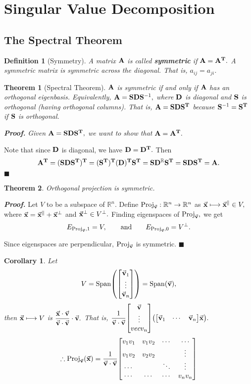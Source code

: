 \documentclass[12pt, a4paper]{article}
\newtheorem{thm}{Theorem}[subsection]
\newtheorem{df}{Definition}[subsection]
\newtheorem{cor}{Corollary}[section]
\newenvironment*{prf}{\par\indent\textbf{\textit{Proof. }}}{\hfill $\blacksquare$\par}
\def\R{{\mathbb{R}}}
\def\T{{\vb{T}}}
\def\Span{\mathrm{Span}}
\def\Proj{\mathrm{Proj}}
\def\vecx{\va{x}}
\def\vecv{\va{v}}
\def\matrixA{\vb{A}}
\def\matrixD{\vb{D}}
\def\matrixS{\vb{S}}
\begin{document}
\newpage
\section{Singular Value Decomposition}
\subsection{The Spectral Theorem}
\begin{df}[Symmetry]
	A matrix $\matrixA$ is called \textbf{symmetric} if $\matrixA=\matrixA^\T.$ A symmetric matrix is symmetric across the diagonal. That is, $a_{ij}=a_{ji}.$	
\end{df}
\begin{thm}[Spectral Theorem]
	$\matrixA$ is symmetric if and only if $\matrixA$ has an orthogonal eigenbasis. Equivalently, $\matrixA=\matrixS\matrixD\matrixS^{-1},$ where $\matrixD$ is diagonal and $\matrixS$ is orthogonal (having orthogonal columns). That is, $\matrixA=\matrixS\matrixD\matrixS^\T$ because $\matrixS^{-1}=\matrixS^\T$ if $\matrixS$ is orthogonal. 	
\end{thm}
\begin{prf}
	\textit{Given $\matrixA=\matrixS\matrixD\matrixS^\T,$ we want to show that $\matrixA=\matrixA^\T.$}\par Note that since $\matrixD$ is diagonal, we have $\matrixD=\matrixD^\T.$ Then
	\[\matrixA^\T=(\matrixS\matrixD\matrixS^\T)^\T=(\matrixS^\T)^\T(\matrixD)^\T\matrixS^\T=\matrixS\matrixD^\R\matrixS^\T=\matrixS\matrixD\matrixS^\T=\matrixA.\]
\end{prf}
\begin{thm}
	Orthogonal projection is symmetric. 	
\end{thm}
\begin{prf}
	Let $V$ to be a subspace of $\R^n$. Define $\Proj_{\vecv}:\R^n\to\R^n$ as $\vecx\longmapsto\vecx^\parallel\in V,$ where $\vecx=\vecx^\parallel+\vecx^\perp$ and $\vecx^\perp\in V^\perp.$ Finding eigenspaces of $\Proj_{\vecv},$ we get \[E_{\Proj_{\vecv},1}=V,\qquad\text{and}\qquad E_{\Proj_{\vecv},0}=V^\perp.\]\par Since eigenspaces are perpendicular, $\Proj_{\vecv}$ is symmetric. 
\end{prf}
\begin{cor}
	Let \[V=\Span\qty(\mqty[\vecv_1\\\vdots\\\vecv_n])=\Span(\vecv),\] then $\vecx\longmapsto V$ is $\dfrac{\vecx\cdot\vecv}{\vecv\cdot\vecv}\cdot\vecv.$ That is, $\dfrac{1}{\vecv\cdot\vecv}\mqty[\vecv\\\vdots\\vecv_n]\qty(\mqty[\vecv_1&\cdots&\vecv_n]\vecx).$ \[\therefore\Proj_{\vecv}\qty(\vecx)=\dfrac{1}{\vecv\cdot\vecv}\mqty[v_1v_1&v_1v_2&\cdots&\cdots\\v_1v_2&v_2v_2&&\vdots\\\cdots&&\ddots&\vdots\\\cdots&\cdots&\cdots&v_nv_n]\]
\end{cor}
\end{document}
